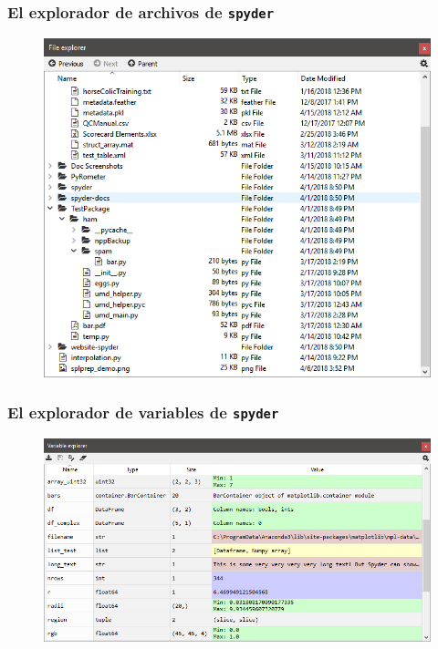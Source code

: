 \begin{frame}[fragile]
\frametitle{El explorador de archivos de \texttt{spyder}}
\begin{figure}
    \centering
    \includegraphics[scale=0.35]{spyder_editor_02.png}
\end{figure}
\end{frame}
\begin{frame}[fragile]
\frametitle{El explorador de variables de \texttt{spyder}}
\begin{figure}
    \centering
    \includegraphics[scale=0.35]{spyder_editor_03.png}
\end{figure}
\end{frame}
